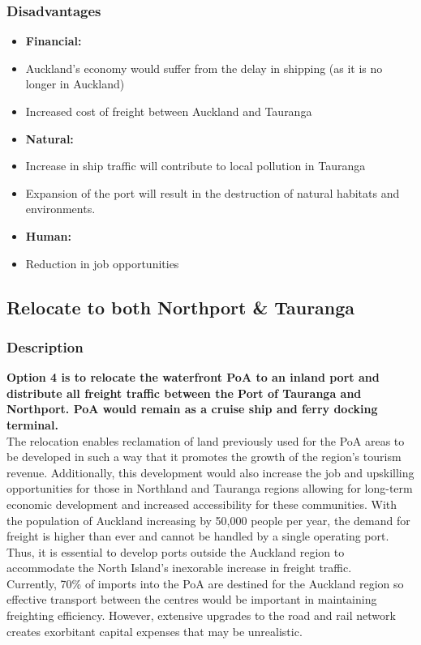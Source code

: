 \begin{multicols}{2}
    \subsubsection*{Disadvantages}
    \begin{itemize}[noitemsep]
        \item []\textbf{Financial: }
        \item{Auckland’s economy would suffer from the delay in shipping (as it is no longer in Auckland)}
        \item{Increased cost of freight between Auckland and Tauranga}
        \item []\textbf{Natural: }
        \item{Increase in ship traffic will contribute to local pollution in Tauranga}
        \item{Expansion of the port will result in the destruction of natural habitats and environments.}
        \item []\textbf{Human: }
        \item{Reduction in job opportunities}
    \end{itemize}

\subsection*{Relocate to both Northport \& Tauranga}
    \subsubsection*{Description}
    \textbf{Option 4 is to relocate the waterfront PoA to an inland port and distribute all freight traffic between the Port of Tauranga and Northport. PoA would remain as a cruise ship and ferry docking terminal.}
    \\The relocation enables reclamation of land previously used for the PoA areas to be developed in such a way that it promotes the growth of the region’s tourism revenue. Additionally, this development would also increase the job and upskilling opportunities for those in Northland and Tauranga regions allowing for long-term economic development and increased accessibility for these communities. With the population of Auckland increasing by 50,000 people per year, the demand for freight is higher than ever and cannot be handled by a single operating port. Thus, it is essential to develop ports outside the Auckland region to accommodate the North Island’s inexorable increase in freight traffic. 
    \\Currently, 70\% of imports into the PoA are destined for the Auckland region so effective transport between the centres would be important in maintaining freighting efficiency. However, extensive upgrades to the road and rail network creates exorbitant capital expenses that may be unrealistic. 



\end{multicols}
